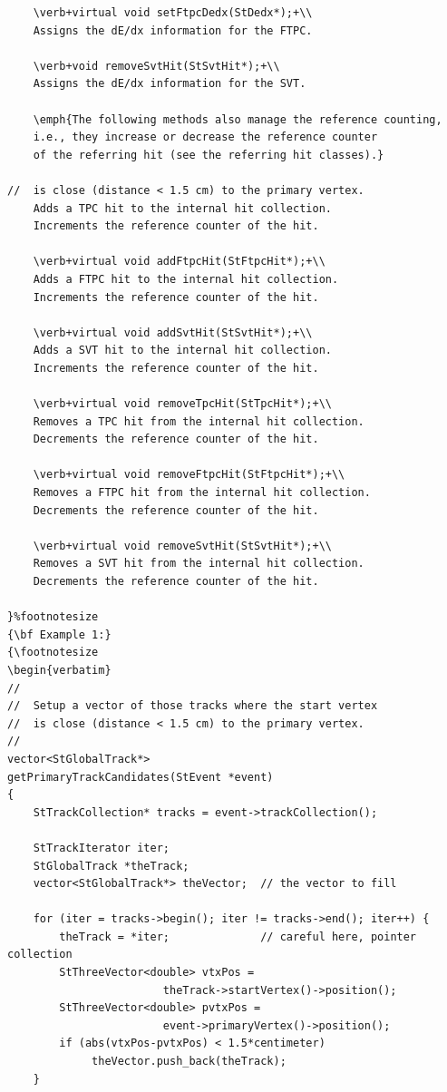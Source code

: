 \begin{Entry}
{\begin{verbatim}
    \verb+virtual void setFtpcDedx(StDedx*);+\\
    Assigns the dE/dx information for the FTPC.

    \verb+void removeSvtHit(StSvtHit*);+\\
    Assigns the dE/dx information for the SVT.

    \emph{The following methods also manage the reference counting,
    i.e., they increase or decrease the reference counter
    of the referring hit (see the referring hit classes).}

//  is close (distance < 1.5 cm) to the primary vertex. 
    Adds a TPC hit to the internal hit collection.
    Increments the reference counter of the hit.

    \verb+virtual void addFtpcHit(StFtpcHit*);+\\
    Adds a FTPC hit to the internal hit collection.
    Increments the reference counter of the hit.

    \verb+virtual void addSvtHit(StSvtHit*);+\\
    Adds a SVT hit to the internal hit collection.
    Increments the reference counter of the hit.

    \verb+virtual void removeTpcHit(StTpcHit*);+\\
    Removes a TPC hit from the internal hit collection.
    Decrements the reference counter of the hit.

    \verb+virtual void removeFtpcHit(StFtpcHit*);+\\
    Removes a FTPC hit from the internal hit collection.
    Decrements the reference counter of the hit.

    \verb+virtual void removeSvtHit(StSvtHit*);+\\
    Removes a SVT hit from the internal hit collection.
    Decrements the reference counter of the hit.

}%footnotesize    
{\bf Example 1:}
{\footnotesize
\begin{verbatim}
//
//  Setup a vector of those tracks where the start vertex
//  is close (distance < 1.5 cm) to the primary vertex.
//
vector<StGlobalTrack*>
getPrimaryTrackCandidates(StEvent *event)
{
    StTrackCollection* tracks = event->trackCollection();

    StTrackIterator iter;
    StGlobalTrack *theTrack;
    vector<StGlobalTrack*> theVector;  // the vector to fill

    for (iter = tracks->begin(); iter != tracks->end(); iter++) {
        theTrack = *iter;              // careful here, pointer collection
        StThreeVector<double> vtxPos =
                        theTrack->startVertex()->position();
        StThreeVector<double> pvtxPos =
                        event->primaryVertex()->position();
        if (abs(vtxPos-pvtxPos) < 1.5*centimeter)
             theVector.push_back(theTrack);
    }


\end{verbatim}}
\end{Entry}
